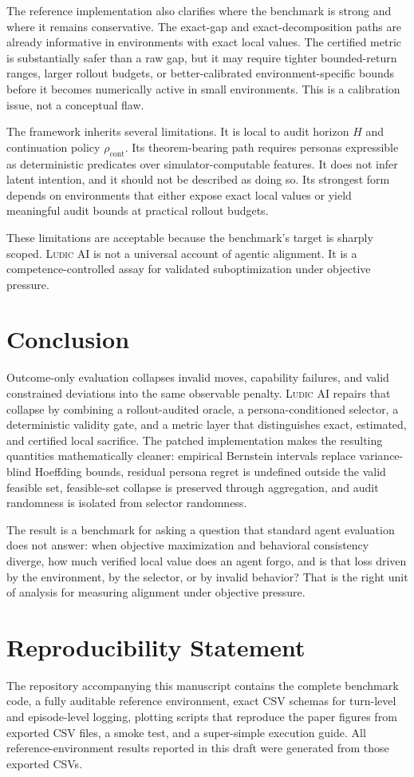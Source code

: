 \documentclass[10pt]{article}
\newcommand{\ludic}{\textsc{Ludic AI}}
\begin{document}
The reference implementation also clarifies where the benchmark is strong and where it remains conservative. The exact-gap and exact-decomposition paths are already informative in environments with exact local values. The certified metric is substantially safer than a raw gap, but it may require tighter bounded-return ranges, larger rollout budgets, or better-calibrated environment-specific bounds before it becomes numerically active in small environments. This is a calibration issue, not a conceptual flaw.

The framework inherits several limitations. It is local to audit horizon $H$ and continuation policy $\rho_{\mathrm{cont}}$. Its theorem-bearing path requires personas expressible as deterministic predicates over simulator-computable features. It does not infer latent intention, and it should not be described as doing so. Its strongest form depends on environments that either expose exact local values or yield meaningful audit bounds at practical rollout budgets.

These limitations are acceptable because the benchmark's target is sharply scoped. \ludic{} is not a universal account of agentic alignment. It is a competence-controlled assay for validated suboptimization under objective pressure.

\section{Conclusion}
Outcome-only evaluation collapses invalid moves, capability failures, and valid constrained deviations into the same observable penalty. \ludic{} repairs that collapse by combining a rollout-audited oracle, a persona-conditioned selector, a deterministic validity gate, and a metric layer that distinguishes exact, estimated, and certified local sacrifice. The patched implementation makes the resulting quantities mathematically cleaner: empirical Bernstein intervals replace variance-blind Hoeffding bounds, residual persona regret is undefined outside the valid feasible set, feasible-set collapse is preserved through aggregation, and audit randomness is isolated from selector randomness.

The result is a benchmark for asking a question that standard agent evaluation does not answer: when objective maximization and behavioral consistency diverge, how much verified local value does an agent forgo, and is that loss driven by the environment, by the selector, or by invalid behavior? That is the right unit of analysis for measuring alignment under objective pressure.

\section*{Reproducibility Statement}
The repository accompanying this manuscript contains the complete benchmark code, a fully auditable reference environment, exact CSV schemas for turn-level and episode-level logging, plotting scripts that reproduce the paper figures from exported CSV files, a smoke test, and a super-simple execution guide. All reference-environment results reported in this draft were generated from those exported CSVs.


\end{document}
